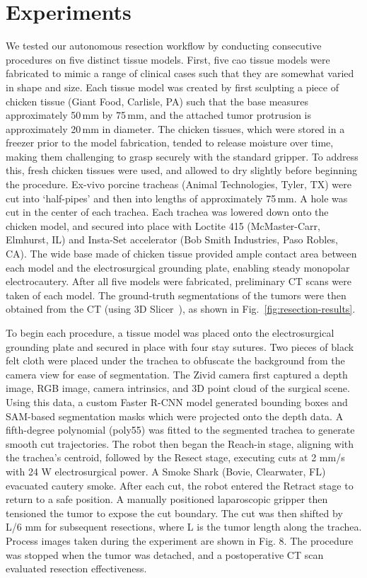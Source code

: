 \section{Experiments}

We tested our autonomous resection workflow by conducting consecutive procedures on five distinct tissue models. First, five \gls{cao} tissue models were fabricated to mimic a range of clinical cases such that they are somewhat varied in shape and size. Each tissue model was created by first sculpting a piece of chicken tissue (Giant Food, Carlisle, PA) such that the base measures approximately 50\,mm by 75\,mm, and the attached tumor protrusion is approximately 20\,mm in diameter. The chicken tissues, which were stored in a freezer prior to the model fabrication, tended to release moisture over time, making them challenging to grasp securely with the standard gripper. To address this, fresh chicken tissues were used, and allowed to dry slightly before beginning the procedure. Ex-vivo porcine tracheas (Animal Technologies, Tyler, TX) were cut into `half-pipes' and then into lengths of approximately 75\,mm. A hole was cut in the center of each trachea. Each trachea was lowered down onto the chicken model, and secured into place with Loctite 415 (McMaster-Carr, Elmhurst, IL) and Insta-Set accelerator (Bob Smith Industries, Paso Robles, CA). The wide base made of chicken tissue provided ample contact area between each model and the electrosurgical grounding plate, enabling steady monopolar electrocautery. After all five models were fabricated, preliminary CT scans were taken of each model. The ground-truth segmentations of the tumors were then obtained from the CT (using 3D Slicer~\cite{Fedorov2012}), as shown in Fig.~\ref{fig:resection-results}. 

To begin each procedure, a tissue model was placed onto the electrosurgical grounding plate and secured in place with four stay sutures. Two pieces of black felt cloth were placed under the trachea to obfuscate the background from the camera view for ease of segmentation. The Zivid camera first captured a depth image, RGB image, camera intrinsics, and 3D point cloud of the surgical scene. Using this data, a custom Faster R-CNN model generated bounding boxes and SAM-based segmentation masks which were projected onto the depth data. A fifth-degree polynomial (poly55) was fitted to the segmented trachea to generate smooth cut trajectories. The robot then began the Reach-in stage, aligning with the trachea’s centroid, followed by the Resect stage, executing cuts at 2 mm/s with 24 W electrosurgical power. A Smoke Shark (Bovie, Clearwater, FL) evacuated cautery smoke. After each cut, the robot entered the Retract stage to return to a safe position. A manually positioned laparoscopic gripper then tensioned the tumor to expose the cut boundary. The cut was then shifted by L/6 mm for subsequent resections, where L is the tumor length along the trachea. Process images taken during the experiment are shown in Fig. 8. The procedure was stopped when the tumor was detached, and a postoperative CT scan evaluated resection effectiveness.

